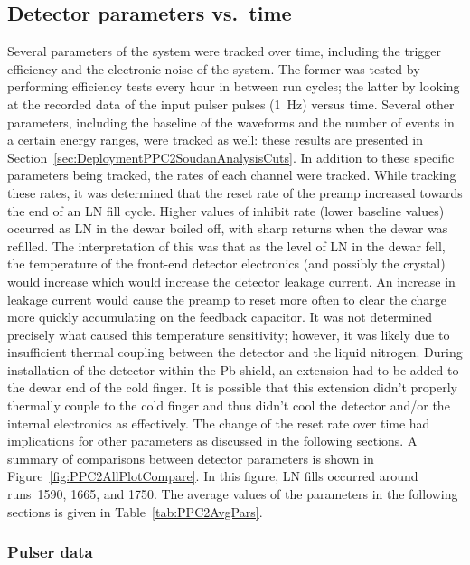 		\subsection{Detector parameters vs.~time}	
		\label{sec:PPC2DetParsVsTime}
		
	Several parameters of the system were tracked over time, including the trigger efficiency and the electronic noise of the system.  The former was tested by performing efficiency tests every hour in between run cycles; the latter by looking at the recorded data of the input pulser pulses (1~Hz) versus time.  Several other parameters, including the baseline of the waveforms and the number of events in a certain energy ranges, were tracked as well: these results are presented in Section~\ref{sec:DeploymentPPC2SoudanAnalysisCuts}.  In addition to these specific parameters being tracked, the rates of each channel were tracked.  While tracking these rates, it was determined that the reset rate of the preamp increased towards the end of an LN fill cycle.  Higher values of inhibit rate (lower baseline values) occurred as LN in the dewar boiled off, with sharp returns when the dewar was refilled.  The interpretation of this was that as the level of LN in the dewar fell, the temperature of the front-end detector electronics (and possibly the crystal) would increase which would increase the detector leakage current.  An increase in leakage current would cause the preamp to reset more often to clear the charge more quickly accumulating on the feedback capacitor.  It was not determined precisely what caused this temperature sensitivity; however, it was likely due to insufficient thermal coupling between the detector and the liquid nitrogen.  During installation of the detector within the Pb shield, an extension had to be added to the dewar end of the cold finger.  It is possible that this extension didn't properly thermally couple to the cold finger and thus didn't cool the detector and/or the internal electronics as effectively.  The change of the reset rate over time had implications for other parameters as discussed in the following sections.  A summary of comparisons between detector parameters is shown in Figure~\ref{fig:PPC2AllPlotCompare}.  In this figure, LN fills occurred around runs~1590, 1665, and 1750.  The average values of the parameters in the following sections is given in Table~\ref{tab:PPC2AvgPars}.
	
	

		    	\subsubsection{Pulser data}
			\label{sec:DeploymentPPC2SoudanAnalysisPulserData}    

